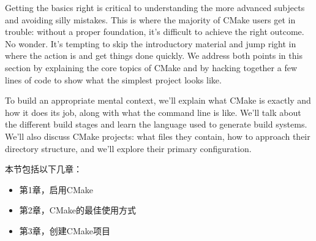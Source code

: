 Getting the basics right is critical to understanding the more advanced subjects and avoiding silly mistakes. This is where the majority of CMake users get in trouble: without a proper foundation, it's difficult to achieve the right outcome. No wonder. It's tempting to skip the introductory material and jump right in where the action is and get things done quickly. We address both points in this section by explaining the core topics of CMake and by hacking together a few lines of code to show what the simplest project looks like.

To build an appropriate mental context, we'll explain what CMake is exactly and how it does its job, along with what the command line is like. We'll talk about the different build stages and learn the language used to generate build systems. We'll also discuss CMake projects: what files they contain, how to approach their directory structure, and we'll explore their primary configuration.

本节包括以下几章：

\begin{itemize}
\item 第1章，启用CMake
\item 第2章，CMake的最佳使用方式
\item 第3章，创建CMake项目
\end{itemize}